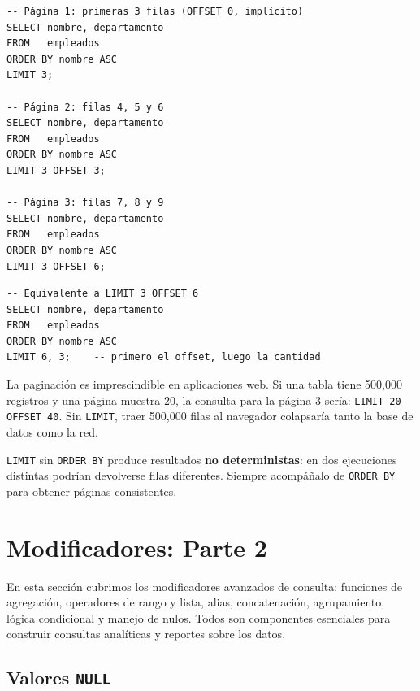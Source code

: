\begin{lstlisting}[caption={LIMIT con OFFSET para paginación.}]
-- Página 1: primeras 3 filas (OFFSET 0, implícito)
SELECT nombre, departamento
FROM   empleados
ORDER BY nombre ASC
LIMIT 3;

-- Página 2: filas 4, 5 y 6
SELECT nombre, departamento
FROM   empleados
ORDER BY nombre ASC
LIMIT 3 OFFSET 3;

-- Página 3: filas 7, 8 y 9
SELECT nombre, departamento
FROM   empleados
ORDER BY nombre ASC
LIMIT 3 OFFSET 6;
\end{lstlisting}

\begin{lstlisting}[caption={Sintaxis abreviada MySQL: LIMIT offset, cantidad.}]
-- Equivalente a LIMIT 3 OFFSET 6
SELECT nombre, departamento
FROM   empleados
ORDER BY nombre ASC
LIMIT 6, 3;    -- primero el offset, luego la cantidad
\end{lstlisting}

\begin{ejemplo}
La paginación es imprescindible en aplicaciones web.
Si una tabla tiene 500,000 registros y una página muestra 20,
la consulta para la página 3 sería:
\texttt{LIMIT 20 OFFSET 40}.
Sin \texttt{LIMIT}, traer 500,000 filas al navegador colapsaría
tanto la base de datos como la red.
\end{ejemplo}

\begin{nota}
\texttt{LIMIT} sin \texttt{ORDER BY} produce resultados
\textbf{no deterministas}: en dos ejecuciones distintas podrían
devolverse filas diferentes.
Siempre acompáñalo de \texttt{ORDER BY} para obtener páginas
consistentes.
\end{nota}



\newpage

\section{Modificadores: Parte 2}

En esta sección cubrimos los modificadores avanzados de consulta:
funciones de agregación, operadores de rango y lista, alias,
concatenación, agrupamiento, lógica condicional y manejo de nulos.
Todos son componentes esenciales para construir consultas analíticas
y reportes sobre los datos.


\subsection{Valores \texttt{NULL}}

